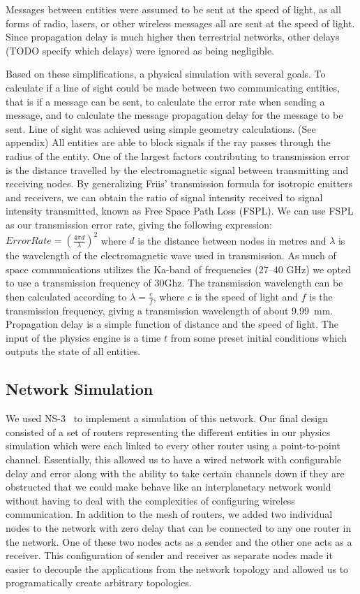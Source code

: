 \documentclass[a4paper,12pt]{article}
\begin{document}
Messages between entities were assumed to be sent at the speed of light, as all
forms of radio, lasers, or other wireless messages all are sent at the speed of
light. Since propagation delay is much higher then terrestrial networks, other
delays (TODO specify which delays) were ignored as being negligible.

Based on these simplifications, a physical simulation with several goals. To
calculate if a line of sight could be made between two communicating entities,
that is if a message can be sent, to calculate the error rate when sending a
message, and to calculate the message propagation delay for the message to be
sent. Line of sight was achieved using simple geometry calculations. (See
appendix) All entities are able to block signals if the ray passes through the
radius of the entity. One of the largest factors contributing to transmission
error is the distance travelled by the electromagnetic signal between
transmitting and receiving nodes. By generalizing Friis' transmission formula
for isotropic emitters and receivers, we can obtain the ratio of signal
intensity received to signal intensity transmitted, known as Free Space Path
Loss (FSPL). We can use FSPL as our transmission error rate, giving the
following expression: $Error Rate = {(\frac{4 \pi d}{\lambda})}^2$ where $d$ is
the distance between nodes in metres and $\lambda$ is the wavelength of the
electromagnetic wave used in transmission. As much of space communications
utilizes the Ka-band of frequencies (27--40 GHz) we opted to use a transmission
frequency of 30Ghz. The transmission wavelength can be then calculated according
to $\lambda = \frac{c}{f}$, where $c$ is the speed of light and $f$ is the
transmission frequency, giving a transmission wavelength of about 9.99~mm.
Propagation delay is a simple function of distance and the speed of light. The
input of the physics engine is a time $t$ from some preset initial conditions
which outputs the state of all entities.

\subsection{Network Simulation}

We used NS-3~\cite{ns-3} to implement a simulation of this network. Our final design
consisted of a set of routers representing the different entities in our physics
simulation which were each linked to every other router using a point-to-point
channel. Essentially, this allowed us to have a wired network with configurable
delay and error along with the ability to take certain channels down if they are
obstructed that we could make behave like an interplanetary network would
without having to deal with the complexities of configuring wireless
communication. In addition to the mesh of routers, we added two individual nodes
to the network with zero delay that can be connected to any one router in the
network. One of these two nodes acts as a sender and the other one acts as a
receiver. This configuration of sender and receiver as separate nodes made it
easier to decouple the applications from the network topology and allowed us to
programatically create arbitrary topologies.
\end{document}
